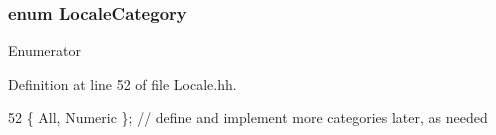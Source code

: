 \subsubsection[{Locale\+Category}]{\setlength{\rightskip}{0pt plus 5cm}enum {\bf Locale\+Category}}\label{Locale_8hh_a2583e4017e088055e9ffe700ed1a13c6}
\begin{Desc}
\item[Enumerator]\par
\begin{description}
\item[{\em 
All\label{Locale_8hh_a2583e4017e088055e9ffe700ed1a13c6a54991d225c58ce0af43461d4e9a82312}
}]\item[{\em 
Numeric\label{Locale_8hh_a2583e4017e088055e9ffe700ed1a13c6a501a5b4eec70f03e52815d519ccd512d}
}]\end{description}
\end{Desc}


Definition at line 52 of file Locale.\+hh.


\begin{DoxyCode}
52 \{ All, Numeric \}; \textcolor{comment}{// define and implement more categories later, as needed}
\end{DoxyCode}
